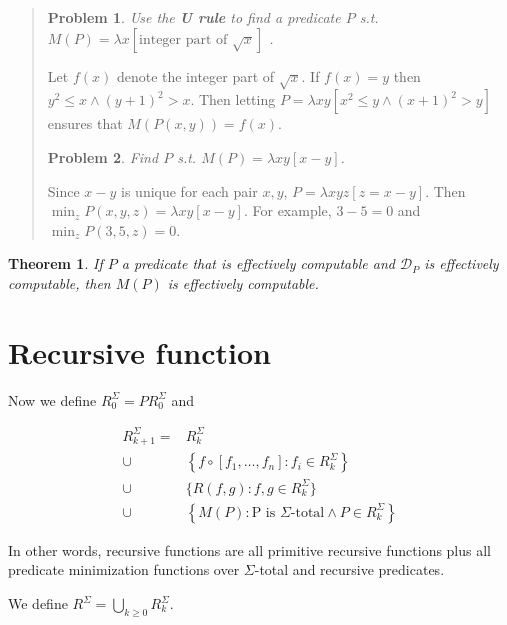 \documentclass[a4paper, 12pt]{article}
\newtheorem{problem}{Problem}
\newtheorem{theorem}{Theorem}
\newtheorem{problem}{Problem}
\newtheorem{theorem}{Theorem}
\begin{document}
\small
\begin{quote}


\begin{problem}
    Use the \textbf{U rule} to find a predicate $P$ s.t. $M(P) = \lambda
    x[\text{integer part of } \sqrt{x}]$ .
\end{problem}

Let $f(x)$ denote the integer part of $\sqrt{x}$. If $f(x) = y$ then $y^2 \leq x
\land (y+1)^2 > x$. Then letting $P = \lambda xy\left[ x^2 \leq y \land (x +
1)^2 > y \right] $ ensures that $M(P(x, y)) = f(x)$.

\begin{problem}
    Find $P$ s.t. $M(P) = \lambda xy\left[ x - y \right] $.
\end{problem}

Since $x - y$ is unique for each pair $x, y$, $P = \lambda xyz [z = x - y]$. Then
$\min_z P(x, y, z) = \lambda xy[x - y]$. For example, $3 - 5 = 0$ and $\min_z
P(3, 5, z) = 0$.

\end{quote}
\normalsize


\begin{theorem}
    If $P$ a predicate that is effectively computable and $\mathcal{D}_P$ is
    effectively computable, then $M(P)$ is effectively computable.
\end{theorem}

\section{Recursive function}

Now we define $R_0^{\Sigma} = PR_0^{\Sigma}$ and 

\begin{align*}
    R_{k+1}^{\Sigma} = &R_k^{\Sigma} \\ \cup &\left\{ f \circ \left[ f_1, \ldots,
    f_n \right] : f_i \in R_{k}^{\Sigma} \right\} \\ \cup &\{R(f, g) : f, g \in
R_k^{\Sigma}\} \\ \cup & \left\{M(P) : \text{P is $\Sigma$-total} \land P \in
R_k^{\Sigma}\right\}
\end{align*}

In other words, recursive functions are all primitive recursive functions plus
all predicate minimization functions over $\Sigma$-total and recursive
predicates.

We define $R^{\Sigma} = \bigcup_{k\geq 0} R_{k}^{\Sigma}$.
\end{document}
